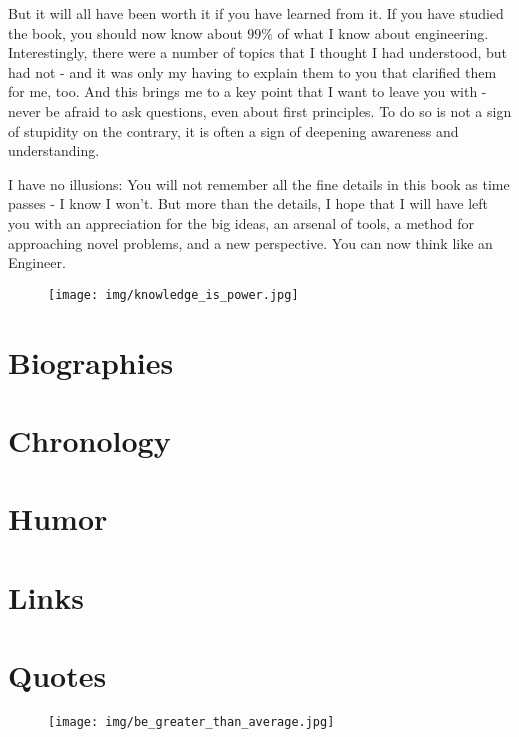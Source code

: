 \documentclass[12pt,a4paper,twoside,openright]{report}
\theoremstyle{definition}
\theoremstyle{itexmp}
\numberwithin{equation}{section}
\begin{document}
	But it will all have been worth it if you have learned from it. If you have studied the book, you should now know about $99\%$ of what I know about engineering. Interestingly, there were a number of topics that I thought I had understood, but had not - and it was only my having to explain them to you that clarified them for me, too. And this brings me to a key point that I want to leave you with - never be afraid to ask questions, even about first principles. To do so is not a sign of stupidity on the
contrary, it is often a sign of deepening awareness and understanding.

	I have no illusions: You will not remember all the fine details in this book as time passes - I know I won't. But more than the details, I hope that I will have left you with an appreciation for the big ideas, an arsenal of tools, a method for approaching novel problems, and a new perspective. You can now think like an Engineer. 
	\begin{figure}[H]
		\centering
		\texttt{[image: img/knowledge\_is\_power.jpg]}	
	\end{figure}
	
	\chapter{Biographies}
	

	\chapter{Chronology}
	

	\chapter{Humor}
	\minitoc
	\pagebreak
	

 	\chapter{Links}
	

			
	\chapter{Quotes}
	\begin{figure}[H]
		\centering
		\texttt{[image: img/be\_greater\_than\_average.jpg]}	
	\end{figure}
	
\end{document}
